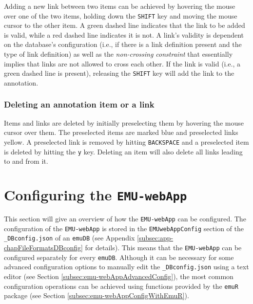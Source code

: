 \documentclass[]{book}
\begin{document}
Adding a new link between two items can be achieved by hovering the mouse over one of the two items, holding down the \texttt{SHIFT} key and moving the mouse cursor to the other item. A green dashed line indicates that the link to be added is valid, while a red dashed line indicates it is not. A link's validity is dependent on the database's configuration (i.e., if there is a link definition present and the type of link definition) as well as the \emph{non-crossing constraint} \citep{coleman:lp1991a} that essentially implies that links are not allowed to cross each other. If the link is valid (i.e., a green dashed line is present), releasing the \texttt{SHIFT} key will add the link to the annotation.

\hypertarget{deleting-an-annotation-item-or-a-link}{%
\subsubsection{Deleting an annotation item or a link}\label{deleting-an-annotation-item-or-a-link}}

Items and links are deleted by initially preselecting them by hovering the mouse cursor over them. The preselected items are marked blue and preselected links yellow. A preselected link is removed by hitting \texttt{BACKSPACE} and a preselected item is deleted by hitting the \texttt{y} key. Deleting an item will also delete all links leading to and from it.

\hypertarget{configuring-the-emu-webapp}{%
\section{\texorpdfstring{Configuring the \texttt{EMU-webApp}}{Configuring the EMU-webApp}}\label{configuring-the-emu-webapp}}

This section will give an overview of how the \texttt{EMU-webApp} can be configured. The configuration of the \texttt{EMU-webApp} is stored in the \texttt{EMUwebAppConfig} section of the \texttt{\_DBconfig.json} of an \texttt{emuDB} (see Appendix \ref{subsec:app-chapFileFormatsDBconfig} for details). This means that the \texttt{EMU-webApp} can be configured separately for every \texttt{emuDB}. Although it can be necessary for some advanced configuration options to manually edit the \texttt{\_DBconfig.json} using a text editor (see Section \ref{subsec:emu-webAppAdvancedConfig}), the most common configuration operations can be achieved using functions provided by the \texttt{emuR} package (see Section \ref{subsec:emu-webAppConfigWithEmuR}).
\end{document}
